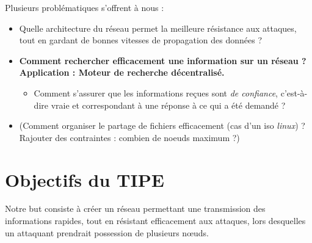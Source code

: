 \documentclass[11pt,a4paper]{article}
\begin{document}
Plusieurs problématiques s'offrent à nous :
\begin{itemize}
	\item Quelle architecture du réseau permet la meilleure résistance aux attaques, tout en gardant de bonnes vitesses de propagation des données ?
	\item \textbf{Comment rechercher efficacement une information sur un réseau ? Application : Moteur de recherche décentralisé.}
	\begin{itemize}
		\item Comment s'assurer que les informations reçues sont \emph{de confiance}, c'est-à-dire vraie et correspondant à une réponse à ce qui a été demandé ?
	\end{itemize}
	
	\item (Comment organiser le partage de fichiers efficacement (cas d'un iso \emph{linux}) ? Rajouter des contraintes : combien de noeuds maximum ?)
	
\end{itemize}

\section{Objectifs du TIPE}

Notre but consiste à créer un réseau permettant une transmission des informations rapides, tout en résistant efficacement aux attaques, lors desquelles un attaquant prendrait possession de plusieurs n{\oe}uds.



%	
%	  
%	



 
\end{document}
